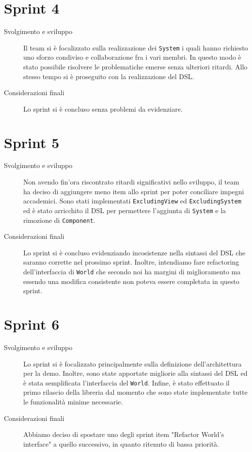 \section{Sprint 4}\label{sec:sprint-4}
\begin{description}
    \item[Svolgimento e sviluppo] Il team si è focalizzato sulla realizzazione dei \texttt{System} i quali hanno richiesto uno sforzo condiviso e collaborazione fra i vari membri.
    In questo modo
    è stato possibile risolvere le problematiche emerse senza ulteriori ritardi.
    Allo stesso tempo si è proseguito con la realizzazione del DSL\@.
    \item[Considerazioni finali] Lo sprint si è concluso senza problemi da evidenziare.
\end{description}
\section{Sprint 5}\label{sec:sprint-5}
\begin{description}
    \item[Svolgimento e sviluppo] Non avendo fin'ora riscontrato ritardi significativi nello sviluppo, il team ha deciso di aggiungere meno item allo sprint per poter conciliare impegni accademici.
    Sono stati implementati \texttt{ExcludingView} ed \texttt{ExcludingSystem} ed è stato arricchito il DSL per permettere l'aggiunta di \texttt{System} e la rimozione di \texttt{Component}.
    \item[Considerazioni finali] Lo sprint si è concluso evidenziando incosistenze nella sintassi del DSL che saranno corrette nel prossimo sprint.
    Inoltre, intendiamo fare refactoring dell'interfaccia di \texttt{World} che secondo noi ha margini di miglioramento ma essendo una modifica consistente non poteva essere completata in questo sprint.
\end{description}
\section{Sprint 6}\label{sec:sprint-6}
\begin{description}
    \item[Svolgimento e sviluppo] Lo sprint si è focalizzato principalmente sulla definizione dell'architettura per la demo.
    Inoltre, sono state apportate migliorie alla sintassi del DSL ed è stata semplificata l'interfaccia del \texttt{World}.
    Infine, è stato effettuato il primo rilascio della libreria dal momento che sono state implementate tutte le funzionalità minime necessarie.
    \item[Considerazioni finali] Abbiamo deciso di spostare uno degli sprint item "Refactor World's interface" a quello successivo, in quanto ritenuto di bassa priorità.
\end{description}

